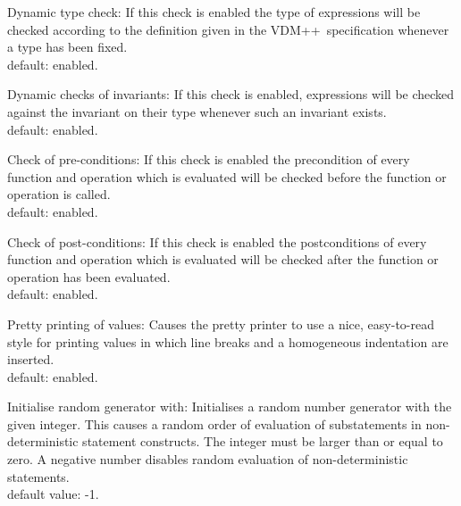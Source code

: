 \documentclass[\pformat,12pt]{article}
\newcommand{\vdmslpp}{VDM++}
\begin{document}
\begin{list}{}{}
\item[{\sf Dynamic type check}:] If this check is enabled the
  type of expressions will be checked according to the definition
  given in the \vdmslpp\ specification whenever a type has been
  fixed. \\
  default: enabled.
  
\item[{\sf Dynamic checks of invariants}:] If this check is
  enabled, expressions will be checked against the invariant on their
  type whenever such an invariant exists. \\
  default: enabled.
  
\item[{\sf Check of pre-conditions}:] If this check is enabled
  the precondition of every function and operation which is evaluated will be checked before
  the function or operation is called. \\
  default: enabled.
  
\item[{\sf Check of post-conditions}:]
  If this check is enabled 
  the postconditions of every function and operation which is
  evaluated will be checked after the function or operation has been
  evaluated. \\
  default: enabled.
  
\item[{\sf Pretty printing of values}:] Causes the pretty printer to
  use a nice, easy-to-read style for printing values in which line
  breaks and a homogeneous indentation are inserted. \\
  default: enabled.
  
\item[{\sf Initialise random generator with}:]
Initialises a random number generator with the given integer.  This
causes a random order of evaluation of substatements in
non-deterministic statement constructs.  The integer must be larger
than or equal to zero. A
negative number disables random evaluation of non-deterministic statements. \\
default value: -1.


\end{list}
\end{document}
